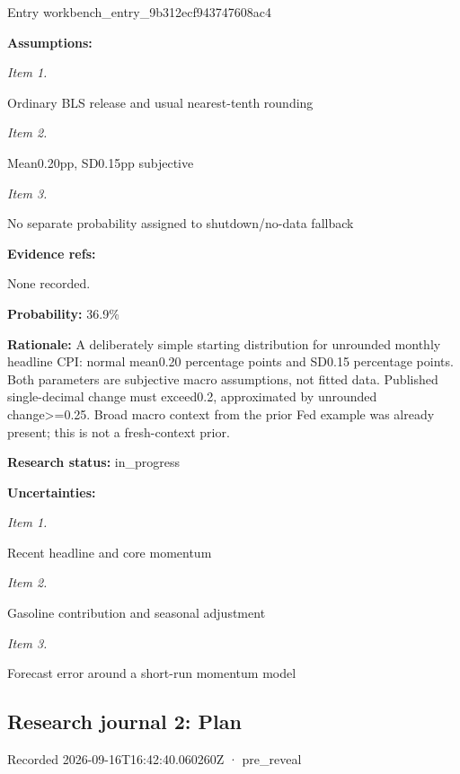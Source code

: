 \documentclass[11pt]{article}
\begin{document}
Entry workbench\_en\hspace{0pt}try\_9b312ecf\hspace{0pt}943747608ac4


\par\noindent\textbf{Assumptions:} \par \par\noindent\textit{Item 1.}\par Ordinary BLS release and usual nearest-tenth rounding

\par\noindent\textit{Item 2.}\par Mean0.20pp, SD0.15pp subjective

\par\noindent\textit{Item 3.}\par No separate probability assigned to shutdown/no-data fallback

\par\noindent\textbf{Evidence refs:} \par None recorded.

\par\noindent\textbf{Probability:} 36.9\%

\par\noindent\textbf{Rationale:} A deliberately simple starting distribution for unrounded monthly headline CPI: normal mean0.20 percentage points and SD0.15 percentage points. Both parameters are subjective macro assumptions, not fitted data. Published single-decimal change must exceed0.2, approximated by unrounded change>=0.25. Broad macro context from the prior Fed example was already present; this is not a fresh-context prior.

\par\noindent\textbf{Research status:} in\_progress

\par\noindent\textbf{Uncertainties:} \par \par\noindent\textit{Item 1.}\par Recent headline and core momentum

\par\noindent\textit{Item 2.}\par Gasoline contribution and seasonal adjustment

\par\noindent\textit{Item 3.}\par Forecast error around a short-run momentum model

\subsection*{\textcolor{epdarkgreen}{Research journal 2: Plan}}
Recorded 2026-09-16T16:42:40.060260Z · pre\_reveal
\end{document}
